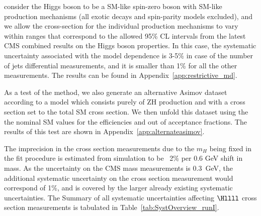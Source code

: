 consider the Higgs boson to be a SM-like spin-zero boson with SM-like production mechanisms (all exotic decays and spin-parity models excluded), and
we allow the cross-section for the individual production mechanisms to vary within ranges that correspond to the allowed 95\% CL intervals from the
latest CMS combined results on the Higgs boson properties. In this case, the systematic uncertainty associated with the model dependence is 3-5\% in
case of the number of jets differential measurements, and it is smaller than 1\% for all the other measurements. The results can be found in
Appendix~\ref{app:restrictive_md}.
\par
As a test of the method, we also generate an alternative Asimov dataset according to a model which consists purely of ZH production and with
a cross section set to the total SM cross section. We then unfold this dataset using the the nominal SM values for the efficiencies and out
of acceptance fractions. The results of this test are shown in Appendix~\ref{app:alternateasimov}.
\par
The imprecision in the cross section measurements due to the $m_{H}$ being fixed in the fit procedure is estimated from simulation to be ~2\% per
0.6 GeV shift in mass. As the uncertainty on the CMS mass measurements is 0.3~GeV, the additional systematic uncertainty on the cross section measurement
would correspond of 1\%, and is covered by the larger already existing systematic uncertainties.
The Summary of all systematic uncertainties affecting $\Hllll$ cross section measurements is tabulated in Table~\ref{tab:SystOverview_runI}.

